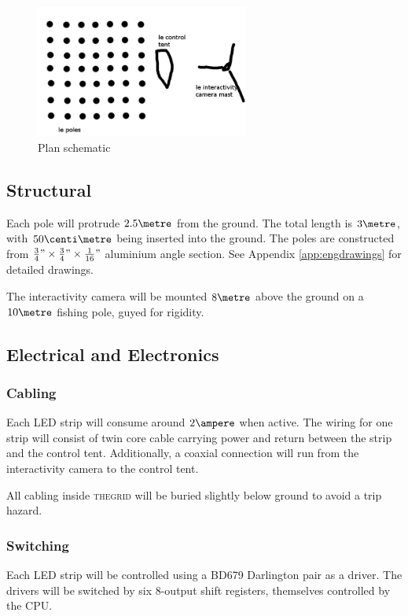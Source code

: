 \documentclass[12pt]{article} %
\newcommand{\thegrid}{\textsc{the\textperiodcentered grid}\xspace}
\begin{document}
\begin{figure}[h]
    \centering
    \includegraphics[width=7cm]{diags/plan.png}
    \caption{Plan schematic}
    \label{fig:planschematic}
\end{figure}

\subsection{Structural}
Each pole will protrude $2.5\metre$ from the ground.  The total length is $3\metre$, with $50\centi\metre$ being inserted into the ground.  The poles are constructed from $\frac{3}{4}" \times \frac{3}{4}" \times \frac{1}{16}"$ aluminium angle section.  See Appendix \ref{app:engdrawings} for detailed drawings.

The interactivity camera will be mounted $8\metre$ above the ground on a $10\metre$ fishing pole, guyed for rigidity.

\subsection{Electrical and Electronics}
\subsubsection{Cabling}
Each LED strip will consume around $2\ampere$ when active.  The wiring for one strip will consist of twin core cable carrying power and return between the strip and the control tent.  Additionally, a coaxial connection will run from the interactivity camera to the control tent.

All cabling inside \thegrid will be buried slightly below ground to avoid a trip hazard.

\subsubsection{Switching}
Each LED strip will be controlled using a BD679 Darlington pair as a driver.  The drivers will be switched by six 8-output shift registers, themselves controlled by the CPU.
\end{document}
